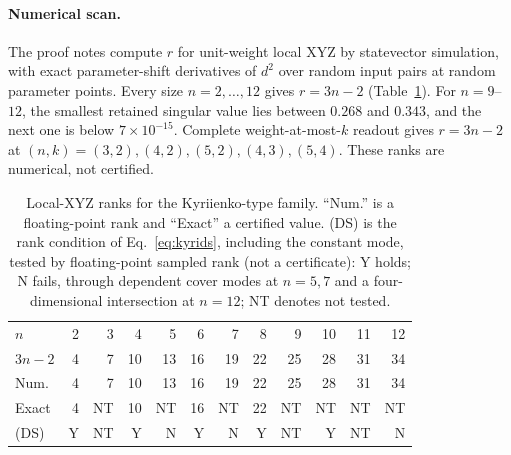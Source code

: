 \paragraph{Numerical scan.}
The proof notes compute $r$ for unit-weight local XYZ by statevector
simulation, with exact parameter-shift derivatives of $d^2$ over
random input pairs at random parameter points. Every size
$n=2,\ldots,12$ gives $r=3n-2$ (Table~\ref{tab:kyriscan}). For
$n=9$--$12$, the smallest retained singular value lies between $0.268$
and $0.343$, and the next one is below $7\times10^{-15}$. Complete
weight-at-most-$k$ readout gives $r=3n-2$ at
$(n,k)=(3,2),(4,2),(5,2),(4,3),(5,4)$. These ranks are numerical,
not certified.

\begin{table}[b]
\caption{Local-XYZ ranks for the Kyriienko-type family. ``Num.'' is a
floating-point rank and ``Exact'' a certified value. (DS) is the rank
condition of Eq.~\eqref{eq:kyrids}, including the constant mode,
tested by floating-point sampled rank (not a certificate): Y holds;
N fails, through dependent cover modes at $n=5,7$ and a
four-dimensional intersection at $n=12$; NT denotes not tested.}
\label{tab:kyriscan}
\setlength{\tabcolsep}{3pt}
\begin{tabular}{lrrrrrrrrrrr}
\toprule
$n$ & 2&3&4&5&6&7&8&9&10&11&12\\
$3n-2$ & 4&7&10&13&16&19&22&25&28&31&34\\
Num. & 4&7&10&13&16&19&22&25&28&31&34\\
Exact & 4&NT&10&NT&16&NT&22&NT&NT&NT&NT\\
(DS) & Y&NT&Y&N&Y&N&Y&NT&Y&NT&N\\
\bottomrule
\end{tabular}
\end{table}

